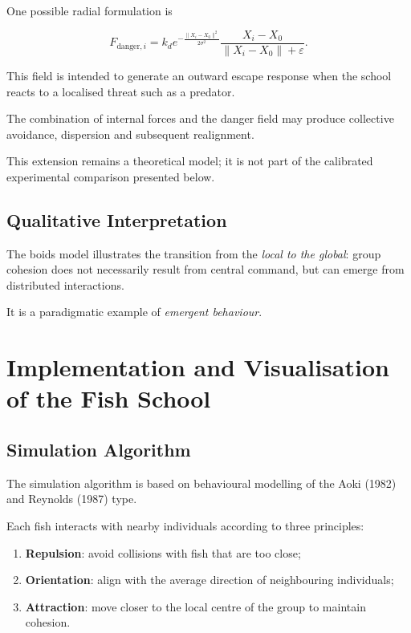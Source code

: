 \documentclass[10pt,a4paper]{article}
\newcommand{\esp}{\vspace*{2\bigskipamount}}
\begin{document}
One possible radial formulation is

\[
F_{\mathrm{danger},i}
=
k_d
e^{-\frac{\|X_i-X_0\|^2}{2\sigma^2}}
\frac{X_i-X_0}
{\|X_i-X_0\|+\varepsilon}.
\]

This field is intended to generate an outward
escape response when the school reacts to a
localised threat such as a predator.

The combination of internal forces and the
danger field may produce collective avoidance,
dispersion and subsequent realignment.

This extension remains a theoretical model;
it is not part of the calibrated experimental
comparison presented below.

\subsection{Qualitative Interpretation}

The boids model illustrates the transition
from the \emph{local to the global}:
group cohesion does not necessarily result
from central command, but can emerge from
distributed interactions.

It is a paradigmatic example of
\emph{emergent behaviour}.

\esp


\section{Implementation and Visualisation
of the Fish School}
\label{app:implementation}

\subsection{Simulation Algorithm}

The simulation algorithm is based on
behavioural modelling of the Aoki (1982)
and Reynolds (1987) type.

Each fish interacts with nearby individuals
according to three principles:

\begin{enumerate}
    \item \textbf{Repulsion}:
    avoid collisions with fish that are too close;

    \item \textbf{Orientation}:
    align with the average direction
    of neighbouring individuals;

    \item \textbf{Attraction}:
    move closer to the local centre
    of the group to maintain cohesion.
\end{enumerate}
\end{document}

